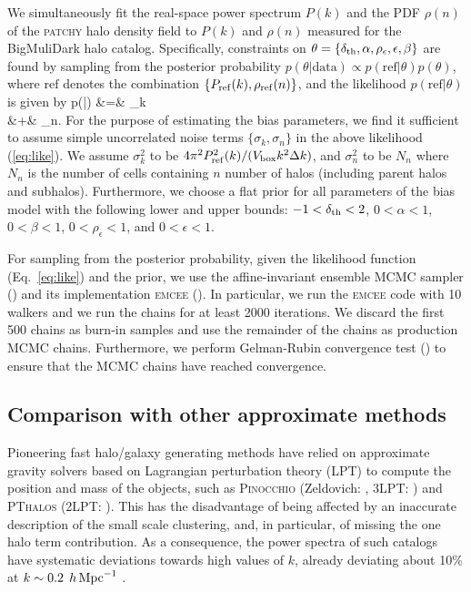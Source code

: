 We simultaneously fit the real-space power spectrum $P(k)$ and the PDF $\rho(n)$ of the \textsc{patchy} halo density field to $P(k)$ and $\rho(n)$ measured for the BigMuliDark halo catalog. Specifically, constraints on $\theta = \{\delta_{\rm th},\alpha, \rho_{\epsilon},\epsilon, \beta\}$ are found by sampling from the posterior probability $p(\theta|\mathrm{data}) \propto p(\mathrm{ref}|\theta)p(\theta)$, where $\mathrm{ref}$ denotes the combination $\{P_{\rm ref} (k), \rho_{\rm ref}(n)\}$, and the likelihood $p(\mathrm{ref}|\theta)$ is given by
\ln p(|\theta) &=& \Sigma_{k} \nonumber \\
&+& \Sigma_{n}.
\label{eq:like}
\ea
For the purpose of estimating the bias parameters, we find it sufficient to assume simple uncorrelated noise terms $\{\sigma_{k},\sigma_{n}\}$ in the above likelihood (\ref{eq:like}). We assume $\sigma_{k}^{2}$ to be $4\pi^{2} P_{\rm ref}^{2}(k)/(V_{\rm box}k^{2}\Delta k)$, and $\sigma_n^{2}$ to be $N_n$ where $N_n$ is the number of cells containing $n$ number of halos (including parent halos and subhalos). Furthermore, we choose a flat prior for all parameters of the bias model with the following lower and upper bounds: $-1<\delta_{\rm th}<2$, $0<\alpha<1$, $0<\beta<1$, $0<\rho_{\epsilon}<1$, and $0<\epsilon<1$.

For sampling from the posterior probability, given the likelihood function (Eq.~\ref{eq:like}) and the prior, we use the affine-invariant ensemble MCMC sampler (\citealt{goodmanweare}) and its implementation \textsc{emcee} (\citealt{emcee}). In particular, we run the \textsc{emcee} code with 10 walkers and we run the chains for at least 2000 iterations. We discard the first 500 chains as burn-in samples and use the remainder of the chains as production MCMC chains. Furthermore, we perform Gelman-Rubin convergence test (\citealt{grtest}) to ensure that the MCMC chains have reached convergence.

\subsection{Comparison with other approximate methods}

Pioneering fast halo/galaxy generating methods have relied on approximate gravity solvers based on Lagrangian perturbation theory (LPT) to compute the position and mass of the objects, such as \textsc{Pinocchio} (Zeldovich: \citealt{monaco2002,monaco2013}, 3LPT: \citealt{monaco2016}) and \textsc{PThalos} (2LPT: \citealt{buchert1993,bouchet1995,catelan1995,scocci2002,pthalo,manera2015}).
This has the disadvantage of being affected by an inaccurate description of the small scale clustering, and, in particular, of missing the one halo term contribution. As a consequence, the power spectra of such catalogs have systematic deviations towards high values of $k$, already deviating about 10$\%$ at $k\sim0.2\; \,h\,{\rm Mpc}^{-1}$ \citep[][]{monaco2013}.

